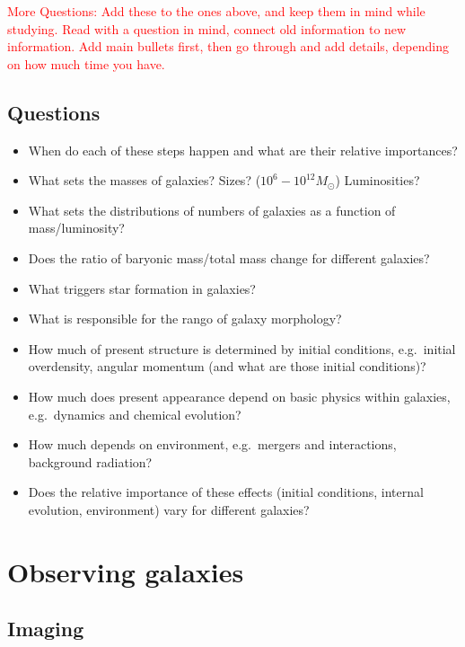 \documentclass{article}
\begin{document}
\textcolor{red}{More Questions: Add these to the ones above, and keep them in mind
while studying. Read with a question in mind, connect old
information to new information. Add main bullets first, then go
through and add details, depending on how much time you have.}

\subsection{Questions}
\begin{itemize}
    \item When do each of these steps happen and what are their
        relative importances?
    \item What sets the masses of galaxies? Sizes?
        ($10^6-10^{12}M_\odot$) Luminosities?
    \item What sets the distributions of numbers of galaxies as a
        function of mass/luminosity?
    \item Does the ratio of baryonic mass/total mass change for
        different galaxies?
    \item What triggers star formation in galaxies?
    \item What is responsible for the rango of galaxy morphology?
    \item How much of present structure is determined by initial
        conditions, e.g.\ initial overdensity, angular momentum (and what
        are those initial conditions)?
    \item How much does present appearance depend on basic physics
        within galaxies, e.g.\ dynamics and chemical evolution?
    \item How much depends on environment, e.g.\ mergers and
        interactions, background radiation?
    \item Does the relative importance of these effects (initial
        conditions, internal evolution, environment) vary for different
        galaxies?
\end{itemize}
\newpage


\newpage
\section{Observing galaxies}
\subsection{Imaging}
\end{document}

